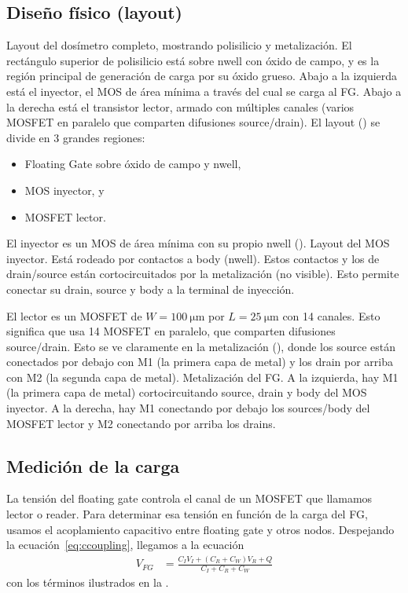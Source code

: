 \subsection{Diseño físico (layout)}
%
{Layout del dosímetro completo, mostrando polisilicio y metalización.
El rectángulo superior de polisilicio está sobre nwell con óxido de campo,
y es la región principal de generación de carga por su óxido grueso.
Abajo a la izquierda está el inyector, 
el MOS de área mínima a través del cual se carga al FG.
Abajo a la derecha está el transistor lector,
armado con múltiples canales 
(varios MOSFET en paralelo que comparten difusiones source/drain).}
El layout () se divide en 3 grandes regiones:
\begin{itemize}
    \item Floating Gate sobre óxido de campo y nwell,
    \item MOS inyector, y
    \item MOSFET lector.
\end{itemize}
El inyector es un MOS de área mínima con su propio nwell
().
{Layout del MOS inyector. Está rodeado por contactos a body (nwell).
Estos contactos y los de drain/source 
están cortocircuitados por la metalización (no visible).}
Esto permite conectar su drain, source y body a la terminal de inyección.

El lector es un MOSFET de $W=\SI{100}{\micro\meter}$ 
por $L=\SI{25}{\micro\meter}$ con 14 canales.
Esto significa que usa 14 MOSFET en paralelo,
que comparten difusiones source/drain. 
Esto se ve claramente en la metalización (),
donde los source están conectados por debajo con M1 (la primera capa de metal)
y los drain por arriba con M2 (la segunda capa de metal).
{Metalización del FG.
A la izquierda, hay M1 (la primera capa de metal) 
cortocircuitando source, drain y body del MOS inyector.
A la derecha, hay M1 conectando por debajo los sources/body del MOSFET lector
y M2 conectando por arriba los drains.}
\subsection{Medición de la carga}
La tensión del floating gate controla el canal de un MOSFET
que llamamos lector o reader.
Para determinar esa tensión en función de la carga del FG,
usamos el acoplamiento capacitivo
entre floating gate y otros nodos.
Despejando la ecuación~\ref{eq:ccoupling}, llegamos a la ecuación
\begin{align*}
    V_{FG} &= \frac{C_I V_I + (C_R+C_W) V_R + Q}{C_I+C_R+C_W}
\end{align*}
con los términos ilustrados en la .

